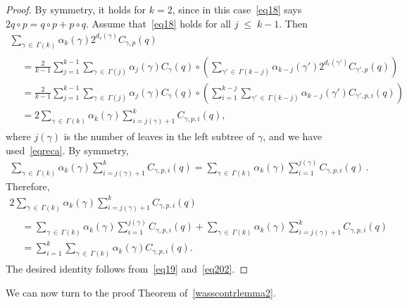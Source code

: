 \documentclass[10pt,a4paper]{article}
\renewcommand{\leq}{\;\leqslant\;}
\begin{document}
\begin{proof}
By symmetry, it holds for $k=2$, since in this case~\eqref{eq18} says $2q\circ p = q\circ p+p\circ q$. Assume that~\eqref{eq18} holds for all $j\leq k-1$. Then
\begin{multline}\label{eq19}
\sum_{\gamma\,\in\,\Gamma(k)}\alpha_k(\gamma)2^{d_r(\gamma)}C_{\gamma,p}(q)\\
\begin{aligned}
&= \frac2{k-1}\sum_{j=1}^{k-1}
\sum_{\gamma\,\in\,\Gamma(j)}\alpha_j(\gamma)C_{\gamma}(q)\circ\left(
\sum_{\gamma'\,\in\,\Gamma(k-j)}\alpha_{k-j}(\gamma')2^{d_r(\gamma')}C_{\gamma',p}(q) \right)\\
& =
\frac2{k-1}\sum_{j=1}^{k-1}\sum_{\gamma\,\in\,\Gamma(j)}\alpha_j(\gamma)C_{\gamma}(q)\circ\left(
\sum_{i=1}^{k-j}\sum_{\gamma'\,\in\,\Gamma(k-j)}\alpha_{k-j}(\gamma')C_{\gamma',p,i}(q) \right)\\
& = 2
\sum_{\gamma\,\in\,\Gamma(k)}\alpha_k(\gamma)\sum_{i=j(\gamma)+1}^{k}C_{\gamma,p,i}(q),
\end{aligned}
\end{multline}
where $j(\gamma)$ is the number of leaves in the left subtree of $\gamma$, and we have used~\eqref{eqreca}. By symmetry,
\begin{align}\label{eq201}
\sum_{\gamma\,\in\,\Gamma(k)}\alpha_k(\gamma)\sum_{i=j(\gamma)+1}^{k}C_{\gamma,p,i}(q) =
\sum_{\gamma\,\in\,\Gamma(k)}\alpha_k(\gamma)\sum_{i=1}^{j(\gamma)}C_{\gamma,p,i}(q)\,.
\end{align}
Therefore,
\begin{multline}\label{eq202}
2
\sum_{\gamma\,\in\,\Gamma(k)}\alpha_k(\gamma)\sum_{i=j(\gamma)+1}^{k}C_{\gamma,p,i}(q)\\
\begin{aligned}
&=
\sum_{\gamma\,\in\,\Gamma(k)}\alpha_k(\gamma)\sum_{i=1}^{j(\gamma)}C_{\gamma,p,i}(q) +\sum_{\gamma\,\in\,\Gamma(k)}\alpha_k(\gamma)\sum_{i=j(\gamma)+1}^{k}C_{\gamma,p,i}(q) \\
& =
\sum_{i=1}^k\sum_{\gamma\,\in\,\Gamma(k)}\alpha_k(\gamma)C_{\gamma,p,i}(q).
\end{aligned}
\end{multline}
The desired identity follows from~\eqref{eq19} and~\eqref{eq202}.
\end{proof}

We can now turn to the proof Theorem of~\ref{wasscontrlemma2}.
\end{document}
